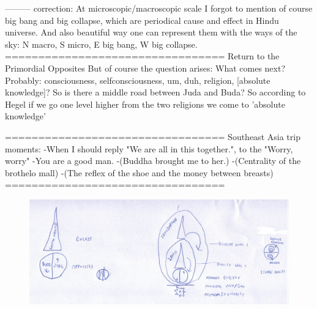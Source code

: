 \documentclass{book}
\begin{document}
---------
correction:
At microscopic/macroscopic scale I forgot to mention of course big bang and big collapse, which are periodical cause and effect in Hindu universe. And also beautiful way one can represent them with the ways of the sky: N macro, S micro, E big bang, W big collapse.
=================================
Return to the Primordial Opposites
But of course the question arises: What comes next? Probably: consciousness, selfconsciousness, um, duh, religion, [absolute knowledge]?
So is there a middle road between Juda and Buda?
So according to Hegel if we go one level higher from the two religions we come to 'absolute knowledge'

=================================
Southeast Asia trip moments:
-When I should reply "We are all in this together.", to the "Worry, worry"
-You are a good man.
-(Buddha brought me to her.)
-(Centrality of the brothelo mall)
-(The reflex of the shoe and the money between breasts)
=================================

\begin{figure}[ht!]
\centering
\includegraphics[width=120mm]{scan00.jpg}
\label{overflow}
\end{figure}
\end{document}
